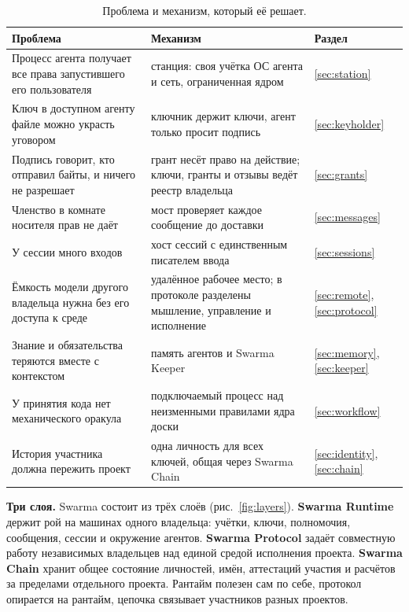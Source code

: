 \documentclass[10pt,a4paper]{article}
\begin{document}
\begin{table}[t]
\centering
\caption{Проблема и механизм, который её решает.}
\label{tab:parts}
\footnotesize
\begin{tabular}{L{6.2cm}L{7.6cm}l}
\toprule
Проблема & Механизм & Раздел \\
\midrule
Процесс агента получает все права запустившего его пользователя & станция: своя учётка ОС агента и сеть, ограниченная ядром & \ref{sec:station} \\
\addlinespace
Ключ в доступном агенту файле можно украсть уговором & ключник держит ключи, агент только просит подпись & \ref{sec:keyholder} \\
\addlinespace
Подпись говорит, кто отправил байты, и ничего не разрешает & грант несёт право на действие; ключи, гранты и отзывы ведёт реестр владельца & \ref{sec:grants} \\
\addlinespace
Членство в комнате носителя прав не даёт & мост проверяет каждое сообщение до доставки & \ref{sec:messages} \\
\addlinespace
У сессии много входов & хост сессий с единственным писателем ввода & \ref{sec:sessions} \\
\addlinespace
Ёмкость модели другого владельца нужна без его доступа к среде & удалённое рабочее место; в протоколе разделены мышление, управление и исполнение & \ref{sec:remote}, \ref{sec:protocol} \\
\addlinespace
Знание и обязательства теряются вместе с контекстом & память агентов и Swarma Keeper & \ref{sec:memory}, \ref{sec:keeper} \\
\addlinespace
У принятия кода нет механического оракула & подключаемый процесс над неизменными правилами ядра доски & \ref{sec:workflow} \\
\addlinespace
История участника должна пережить проект & одна личность для всех ключей, общая через Swarma Chain & \ref{sec:identity}, \ref{sec:chain} \\
\bottomrule
\end{tabular}
\end{table}

\textbf{Три слоя.} Swarma состоит из трёх слоёв (рис.~\ref{fig:layers}). \textbf{Swarma Runtime} держит рой на машинах одного владельца: учётки, ключи, полномочия, сообщения, сессии и окружение агентов. \textbf{Swarma Protocol} задаёт совместную работу независимых владельцев над единой средой исполнения проекта. \textbf{Swarma Chain} хранит общее состояние личностей, имён, аттестаций участия и расчётов за пределами отдельного проекта. Рантайм полезен сам по себе, протокол опирается на рантайм, цепочка связывает участников разных проектов.
\end{document}
